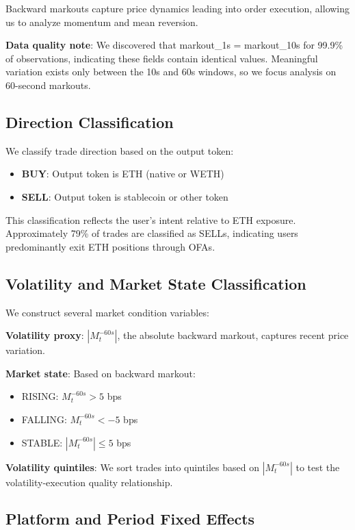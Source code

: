 \documentclass[12pt,a4paper]{article}
\begin{document}
Backward markouts capture price dynamics leading into order execution, allowing us to analyze momentum and mean reversion.

\textbf{Data quality note}: We discovered that markout\_1s = markout\_10s for 99.9\% of observations, indicating these fields contain identical values. Meaningful variation exists only between the 10s and 60s windows, so we focus analysis on 60-second markouts.

\subsection{Direction Classification}

We classify trade direction based on the output token:
\begin{itemize}
    \item \textbf{BUY}: Output token is ETH (native or WETH)
    \item \textbf{SELL}: Output token is stablecoin or other token
\end{itemize}

This classification reflects the user's intent relative to ETH exposure. Approximately 79\% of trades are classified as SELLs, indicating users predominantly exit ETH positions through OFAs.

\subsection{Volatility and Market State Classification}

We construct several market condition variables:

\textbf{Volatility proxy}: $|M_t^{-60s}|$, the absolute backward markout, captures recent price variation.

\textbf{Market state}: Based on backward markout:
\begin{itemize}
    \item RISING: $M_t^{-60s} > 5$ bps
    \item FALLING: $M_t^{-60s} < -5$ bps
    \item STABLE: $|M_t^{-60s}| \leq 5$ bps
\end{itemize}

\textbf{Volatility quintiles}: We sort trades into quintiles based on $|M_t^{-60s}|$ to test the volatility-execution quality relationship.

\subsection{Platform and Period Fixed Effects}
\end{document}
